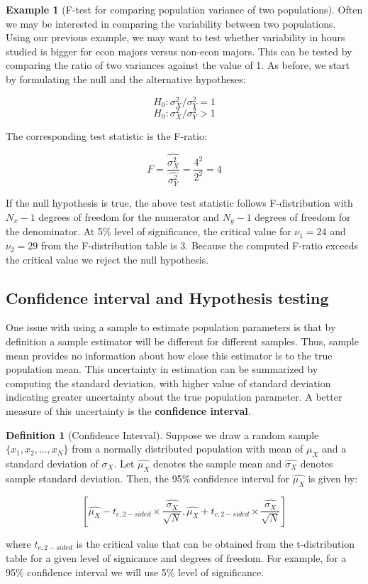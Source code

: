 \documentclass[
]{book}
\theoremstyle{definition}
\newtheorem{definition}{Definition}[chapter]
\theoremstyle{definition}
\newtheorem{example}{Example}[chapter]
\theoremstyle{definition}
\theoremstyle{definition}
\theoremstyle{remark}
\begin{document}
\begin{example}[F-test for comparing population variance of two populations]
\protect\hypertarget{exm:unnamed-chunk-96}{}\label{exm:unnamed-chunk-96}Often we may be interested in comparing the variability between two populations. Using our previous example, we may want to test whether variability in hours studied is bigger for econ majors versus non-econ majors. This can be tested by comparing the ratio of two variances against the value of 1. As before, we start by formulating the null and the alternative hypotheses:

\[H_0: \sigma^2_X/\sigma^2_Y = 1\]
\[H_0: \sigma^2_X/\sigma^2_Y > 1\]

The corresponding test statistic is the F-ratio:

\[F = \frac{\hat{\sigma^2_X}}{\hat{\sigma^2_Y}}=\frac{4^2}{2^2}=4\]

If the null hypothesis is true, the above test statistic follows F-distribution with \(N_x-1\) degrees of freedom for the numerator and \(N_y-1\) degrees of freedom for the denominator. At 5\% level of significance, the critical value for \(\nu_1=24\) and \(\nu_2=29\) from the F-distribution table is 3. Because the computed F-ratio exceeds the critical value we reject the null hypothesis.
\end{example}

\hypertarget{confidence-interval-and-hypothesis-testing}{%
\subsection{Confidence interval and Hypothesis testing}\label{confidence-interval-and-hypothesis-testing}}

One issue with using a sample to estimate population parameters is that by definition a sample estimator will be different for different samples. Thus, sample mean provides no information about how close this estimator is to the true population mean. This uncertainty in estimation can be summarized by computing the standard deviation, with higher value of standard deviation indicating greater uncertainty about the true population parameter. A better measure of this uncertainty is the \textbf{confidence interval}.

\begin{definition}[Confidence Interval]
\protect\hypertarget{def:unnamed-chunk-97}{}\label{def:unnamed-chunk-97}Suppose we draw a random sample \(\{x_1, x_2,...,x_N\}\) from a normally distributed population with mean of \(\mu_X\) and a standard deviation of \(\sigma_X\). Let \(\hat{\mu_X}\) denotes the sample mean and \(\hat{\sigma_X}\) denotes sample standard deviation. Then, the 95\% confidence interval for \(\hat{\mu_X}\) is given by:

\[\left[\hat{\mu_X}-t_{c,2-sided} \times \frac{\hat{\sigma_X}}{\sqrt{N}},\hat{\mu_X}+t_{c,2-sided} \times \frac{\hat{\sigma_X}}{\sqrt{N}} \right]\]

where \(t_{c,2-sided}\) is the critical value that can be obtained from the t-distribution table for a given level of signicance and degrees of freedom. For example, for a 95\% confidence interval we will use 5\% level of significance.
\end{definition}
\end{document}
